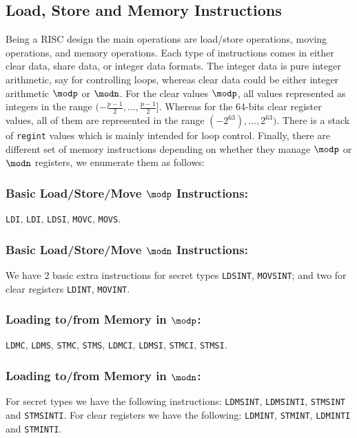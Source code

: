 \subsection{Load, Store and Memory Instructions}
Being a RISC design the main operations are load/store
operations, moving operations, and memory operations.
Each type of instructions comes in either clear data, 
share data, or integer data formats. 
The integer data is pure integer arithmetic, say
for controlling loops, whereas clear data could be either integer
arithmetic $\modp$ or $\modn$.
For the clear values  $\modp$, all values represented as integers 
in the range $(-\frac{p-1}{2}, \dots, \frac{p-1}{2}]$. 
Whereas for the 64-bits clear register values, all of them are represented 
in the range $(-2^{63}), \dots, 2^{63})$.
There is a stack of \verb+regint+ values which is mainly intended for loop
control.
Finally, there are different set of memory instructions depending on whether they manage $\modp$ or $\modn$ registers, we enumerate them as follows:

\subsubsection{Basic Load/Store/Move  $\modp$ Instructions:}
\verb+LDI+,
\verb+LDI+,
\verb+LDSI+,
\verb+MOVC+,
\verb+MOVS+.


\subsubsection{Basic Load/Store/Move $\modn$ Instructions:}
We have 2 basic extra instructions for secret types \verb+LDSINT+,
\verb+MOVSINT+; and two for clear registers \verb+LDINT+, \verb+MOVINT+.


\subsubsection{Loading to/from Memory in $\modp$:}
 \verb+LDMC+,
 \verb+LDMS+,
 \verb+STMC+,
 \verb+STMS+,
 \verb+LDMCI+,
 \verb+LDMSI+,
 \verb+STMCI+,
 \verb+STMSI+.

\subsubsection{Loading to/from Memory in $\modn$:}
For secret types we have the following instructions: \verb+LDMSINT+, \verb+LDMSINTI+, \verb+STMSINT+ and \verb+STMSINTI+. For clear registers we have the following: \verb+LDMINT+, \verb+STMINT+, \verb+LDMINTI+ and \verb+STMINTI+.

